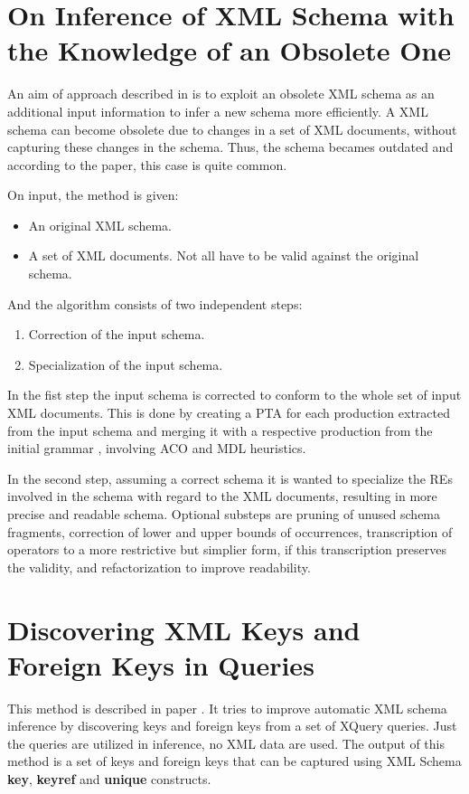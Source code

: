 
\section{On Inference of XML Schema with the Knowledge of an Obsolete One}
An aim of approach described in \cite{Mlynkova:2009:IXS:1862681.1862693} is to exploit an obsolete XML schema as an additional input information to infer a new schema more efficiently. A XML schema can become obsolete due to changes in a set of XML documents, without capturing these changes in the schema. Thus, the schema becames outdated and according to the paper, this case is quite common.

On input, the method is given:
\begin{itemize}
\item An original XML schema.
\item A set of XML documents. Not all have to be valid against the original schema.
\end{itemize}

And the algorithm consists of two independent steps:

\begin{enumerate}
\item Correction of the input schema.
\item Specialization of the input schema.
\end{enumerate}

In the fist step the input schema is corrected to conform to the whole set of input XML documents. This is done by creating a PTA  for each production extracted from the input schema and merging it with a respective production from the initial grammar , involving ACO and MDL heuristics.

In the second step, assuming a correct schema it is wanted to specialize the REs involved in the schema with regard to the XML documents, resulting in more precise and readable schema. Optional substeps are pruning of unused schema fragments, correction of lower and upper bounds of occurrences, transcription of operators to a more restrictive but simplier form, if this transcription preserves the validity, and refactorization to improve readability.

\section{Discovering XML Keys and Foreign Keys in Queries}
This method is described in paper \cite{Necasky:2009:DXK:1529282.1529414}. It tries to improve automatic XML schema inference by discovering keys and foreign keys from a set of XQuery queries. Just the queries are utilized in inference, no XML data are used. The output of this method is a set of keys and foreign keys that can be captured using XML Schema \textbf{key}, \textbf{keyref} and \textbf{unique} constructs.


